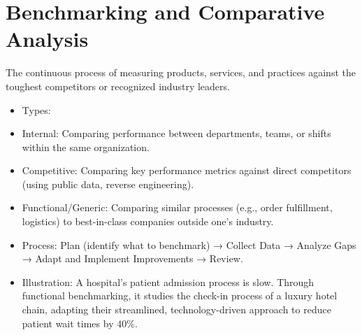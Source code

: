 \documentclass[10pt]{article}
\begin{document}
\section*{Benchmarking and Comparative Analysis}
The continuous process of measuring products, services, and practices against the toughest competitors or recognized industry leaders.

\begin{itemize}
  \item Types:
  \item Internal: Comparing performance between departments, teams, or shifts within the same organization.
  \item Competitive: Comparing key performance metrics against direct competitors (using public data, reverse engineering).
  \item Functional/Generic: Comparing similar processes (e.g., order fulfillment, logistics) to best-in-class companies outside one's industry.
  \item Process: Plan (identify what to benchmark) → Collect Data → Analyze Gaps → Adapt and Implement Improvements → Review.
  \item Illustration: A hospital's patient admission process is slow. Through functional benchmarking, it studies the check-in process of a luxury hotel chain, adapting their streamlined, technology-driven approach to reduce patient wait times by $40 \%$.
\end{itemize}
\end{document}
